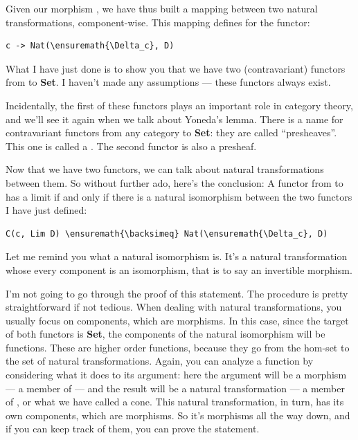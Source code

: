 \begin{figure}[H]
\centering
{}
\end{figure}

\noindent
Given our morphism , we have thus built a mapping between two
natural transformations, component-wise. This mapping defines
 for the functor:

\begin{Verbatim}[commandchars=\\\{\}]
c -> Nat(\ensuremath{\Delta_c}, D)
\end{Verbatim}
What I have just done is to show you that we have two (contravariant)
functors from  to \textbf{Set}. I haven't made any assumptions
--- these functors always exist.

Incidentally, the first of these functors plays an important role in
category theory, and we'll see it again when we talk about Yoneda's
lemma. There is a name for contravariant functors from any category
 to \textbf{Set}: they are called ``presheaves''. This one is
called a . The second functor is also a
presheaf.

Now that we have two functors, we can talk about natural transformations
between them. So without further ado, here's the conclusion: A functor
 from  to  has a limit  if and
only if there is a natural isomorphism between the two functors I have
just defined:

\begin{Verbatim}[commandchars=\\\{\}]
C(c, Lim D) \ensuremath{\backsimeq} Nat(\ensuremath{\Delta_c}, D)
\end{Verbatim}
Let me remind you what a natural isomorphism is. It's a natural
transformation whose every component is an isomorphism, that is to say
an invertible morphism.

I'm not going to go through the proof of this statement. The procedure
is pretty straightforward if not tedious. When dealing with natural
transformations, you usually focus on components, which are morphisms.
In this case, since the target of both functors is \textbf{Set}, the
components of the natural isomorphism will be functions. These are
higher order functions, because they go from the hom-set to the set of
natural transformations. Again, you can analyze a function by
considering what it does to its argument: here the argument will be a
morphism --- a member of  --- and the result will
be a natural transformation --- a member of , or
what we have called a cone. This natural transformation, in turn, has
its own components, which are morphisms. So it's morphisms all the way
down, and if you can keep track of them, you can prove the statement.

